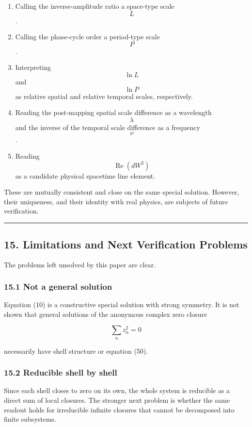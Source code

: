 \documentclass[
  a4paper,
]{article}
\providecommand{\tightlist}{%
  \setlength{\itemsep}{0pt}\setlength{\parskip}{0pt}}
\begin{document}
\begin{enumerate}
\def\labelenumi{\arabic{enumi}.}
\tightlist
\item
  Calling the inverse-amplitude ratio a space-type scale \[L\].
\item
  Calling the phase-cycle order a period-type scale \[P\].
\item
  Interpreting \[\ln L\] and \[\ln P\] as relative spatial and relative
  temporal scales, respectively.
\item
  Reading the post-mapping spatial scale difference as a wavelength
  \[\lambda\] and the inverse of the temporal scale difference as a
  frequency \[\nu\].
\item
  Reading \[\operatorname{Re}(dW^2)\] as a candidate physical spacetime
  line element.
\end{enumerate}

These are mutually consistent and close on the same special solution.
However, their uniqueness, and their identity with real physics, are
subjects of future verification.

\begin{center}\rule{0.5\linewidth}{0.5pt}\end{center}

\subsection{15. Limitations and Next Verification
Problems}\label{limitations-and-next-verification-problems}

The problems left unsolved by this paper are clear.

\subsubsection{15.1 Not a general
solution}\label{not-a-general-solution}

Equation (10) is a constructive special solution with strong symmetry.
It is not shown that general solutions of the anonymous complex zero
closure

\[
\sum_n z_n^2=0
\]

necessarily have shell structure or equation (50).

\subsubsection{15.2 Reducible shell by
shell}\label{reducible-shell-by-shell}

Since each shell closes to zero on its own, the whole system is
reducible as a direct sum of local closures. The stronger next problem
is whether the same readout holds for irreducible infinite closures that
cannot be decomposed into finite subsystems.
\end{document}
